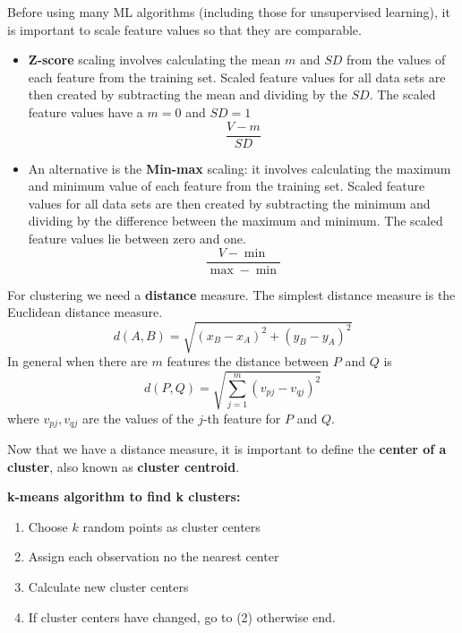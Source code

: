 Before using many ML algorithms (including those for unsupervised learning), it is important to scale feature values so that they are comparable.
\begin{itemize}
    \item \textbf{Z-score} scaling involves calculating the mean $m$ and $SD$ from the values of each feature from the training set. Scaled feature values for all data sets are then created by subtracting the mean and dividing by the $SD$. The scaled feature values have a $m=0$ and $SD=1$
          \begin{equation*}
              \frac{V-m}{SD}
          \end{equation*}
    \item An alternative is the \textbf{Min-max} scaling: it involves calculating the maximum and minimum value of each feature from the training set. Scaled feature values for all data sets are then created by subtracting the minimum and dividing by the difference between the maximum and minimum. The scaled feature values lie between zero and one.
          \begin{equation*}
              \frac{V-\min}{\max -\min}
          \end{equation*}
\end{itemize}

For clustering we need a \textbf{distance} measure. The simplest distance measure is the Euclidean distance measure.
\begin{equation*}
    d\left( A,B\right) =\sqrt{\left( x_{B} -x_{A}\right)^{2} +\left( y_{B} -y_{A}\right)^{2}}
\end{equation*}
In general when there are $m$ features the distance between $P$ and $Q$ is
\begin{equation*}
    d\left( P,Q\right) =\sqrt{\sum\limits _{j=1}^{m}\left( v_{pj} -v_{qj}\right)^{2}}
\end{equation*}
where $v_{pj} ,v_{qj}$ are the values of the $j$-th feature for $P$ and $Q$.

Now that we have a distance measure, it is important to define the \textbf{center of a cluster}, also known as \textbf{cluster centroid}.

\textbf{k-means algorithm to find k clusters:}
\begin{enumerate}
    \item Choose $k$ random points as cluster centers
    \item Assign each observation no the nearest center
    \item Calculate new cluster centers
    \item If cluster centers have changed, go to (2) otherwise end.
\end{enumerate}

